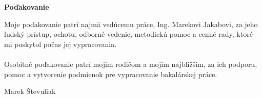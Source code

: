 \newpage
\thispagestyle{plain}
\vspace*{14cm} 
\noindent
\begin{center}
	{\large\textbf{Poďakovanie}} \\
\end{center}

\noindent
Moje poďakovanie patrí najmä vedúcemu práce, Ing. Marekovi Jakabovi, za jeho ľudský prístup, ochotu, odborné vedenie, metodickú pomoc a cenné rady, ktoré mi poskytol počas jej vypracovania. \\ \\
\noindent
Osobitné poďakovanie patrí mojim rodičom a mojim najbližším, za ich podporu, pomoc a vytvorenie podmienok pre vypracovanie bakalárskej práce.

\vspace*{0.7cm}
\noindent
\hspace{11.2cm}Marek Števuliak